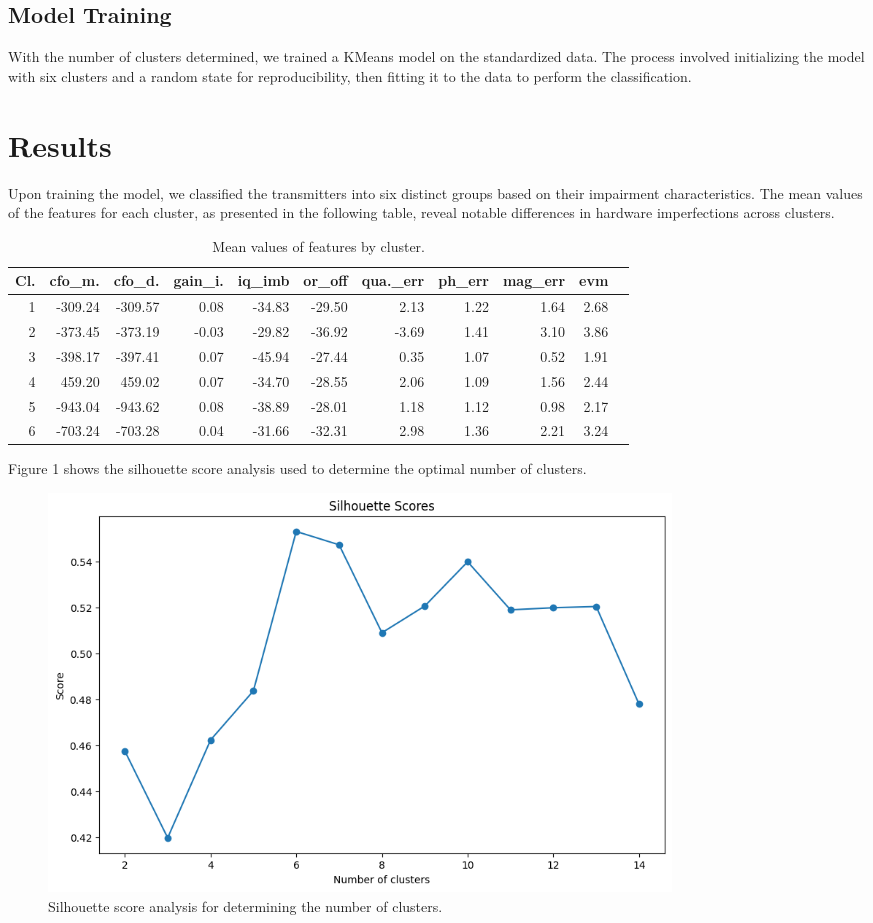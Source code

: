\documentclass{article}
\begin{document}
\subsection{Model Training}
With the number of clusters determined, we trained a KMeans model on the standardized data. The process involved initializing the model with six clusters and a random state for reproducibility, then fitting it to the data to perform the classification.

\section{Results}
Upon training the model, we classified the transmitters into six distinct groups based on their impairment characteristics. The mean values of the features for each cluster, as presented in the following table, reveal notable differences in hardware imperfections across clusters.

\begin{table}[ht]
\centering
\begin{tabular}{rrrrrrrrrrr}
\hline
Cl. & cfo\_m. & cfo\_d. & gain\_i. & iq\_imb & or\_off & qua.\_err & ph\_err & mag\_err & evm \\
\hline
1 & -309.24 & -309.57 & 0.08 & -34.83 & -29.50 & 2.13 & 1.22 & 1.64 & 2.68 \\
2 & -373.45 & -373.19 & -0.03 & -29.82 & -36.92 & -3.69 & 1.41 & 3.10 & 3.86 \\
3 & -398.17 & -397.41 & 0.07 & -45.94 & -27.44 & 0.35 & 1.07 & 0.52 & 1.91 \\
4 & 459.20 & 459.02 & 0.07 & -34.70 & -28.55 & 2.06 & 1.09 & 1.56 & 2.44 \\
5 & -943.04 & -943.62 & 0.08 & -38.89 & -28.01 & 1.18 & 1.12 & 0.98 & 2.17 \\
6 & -703.24 & -703.28 & 0.04 & -31.66 & -32.31 & 2.98 & 1.36 & 2.21 & 3.24 \\
\hline
\end{tabular}
\caption{Mean values of features by cluster.}
\label{table:mean}
\end{table}

Figure 1 shows the silhouette score analysis used to determine the optimal number of clusters.

\begin{figure}[ht]
\centering
\includegraphics[width=0.8\textwidth]{silhouette.png}
\caption{Silhouette score analysis for determining the number of clusters.}
\label{fig:silhouette}
\end{figure}
\end{document}
